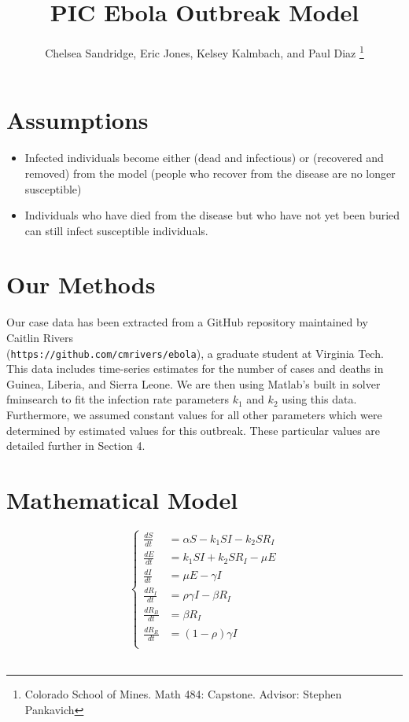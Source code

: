 \documentclass{article}
\title{PIC Ebola Outbreak Model}
\author{Chelsea Sandridge, Eric Jones, Kelsey Kalmbach, and Paul Diaz 
\thanks{Colorado School of Mines. Math 484: Capstone. Advisor: Stephen Pankavich}}
\begin{document}
\maketitle 

\section{Assumptions}
\begin{itemize}
\item Infected individuals become either (dead and infectious) or (recovered and removed) from the model (people who recover from the disease are no longer susceptible)
\item Individuals who have died from the disease but who have not yet been buried can still infect susceptible individuals.
\end{itemize}

\section{Our Methods}
Our case data has been extracted from a GitHub repository maintained by Caitlin Rivers \\ (\texttt{https://github.com/cmrivers/ebola}), a graduate student at Virginia Tech. This data includes time-series estimates for the number of cases and deaths in Guinea, Liberia, and Sierra Leone.  
We are then using Matlab's built in solver fminsearch to fit the infection rate parameters $k_1$ and $k_2$ using this data. Furthermore, we assumed constant values for all other parameters which were determined by estimated values for this outbreak. These particular values are detailed further in Section 4.  
\section{Mathematical Model}

\begin{equation} \left\lbrace
\begin{aligned} 
\frac{dS}{dt} &= \alpha S - k_1 S I -k_2 S R_I \\
\frac{dE}{dt} &=  k_1 S I +k_2 S R_I - \mu E \\
\frac{dI}{dt} &=  \mu E - \gamma I\\
\frac{dR_I}{dt} &= \rho\gamma I - \beta R_I \\
\frac{dR_B}{dt} &= \beta R_I \\
\frac{dR_R}{dt} &= (1-\rho)\gamma I \\
\end{aligned} \label{std_seir}
\right.
 \end{equation} \\
 
\end{document}
